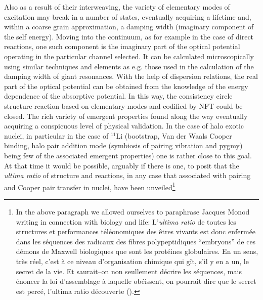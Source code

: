 \begin{subappendices}
Also as a result of their interweaving,  the variety of elementary modes of excitation may break in a number of states, eventually acquiring a lifetime and, within a coarse grain approximation, a damping width (imaginary component of the self energy). Moving into the continuum, as for example in the case of direct reactions, one such component is the imaginary part of the optical potential operating in the particular channel selected. It can be calculated microscopically using similar techniques and elements as e.g. those used in the calculation of the damping width of giant resonances. With the help of dispersion relations, the real part of the optical potential can be obtained from the knowledge of the energy dependence of the absorptive potential. In this way, the consistency circle structure-reaction based on elementary modes and codified by NFT could be closed. The rich variety of emergent properties found along the way eventually acquiring a conspicuous level of physical validation. In the case of halo exotic nuclei, in particular in the case of $^{11}$Li (bootstrap, Van der Waals Cooper binding, halo pair addition mode (symbiosis of pairing vibration and pygmy) being few of the associated emergent properties) one is rather close to this goal. At that time it would be possible, arguably if there is one, to posit that the \textit{ultima ratio} of structure and reactions, in any case that associated with pairing and Cooper pair transfer in nuclei, have been unveiled\footnote{In the above paragraph we allowed ourselves to paraphrase Jacques Monod writing in connection with biology and life: L'\textit{ultima ratio} de toutes les structures et performances t\'el\'eonomiques des \^etres vivants est donc enferm\'ee dans les s\'equences des radicaux des fibres polypeptidiques ``embryons'' de ces d\'emons de Maxwell biologiques que sont les prot\'eines globulaires. En un sens, tr\`{e}s r\'{e}el, c'est \`a ce niveau d'organisation chimique qui g\^it, s'il y en a un, le secret de la vie. Et saurait--on non seullement d\'ecrire les s\'equences, mais \'enoncer la loi d'assemblage \`a laquelle ob\'eissent, on pourrait dire que le secret est perc\'e, l'ultima ratio d\'ecouverte (\cite{Monod:70}).}

\end{subappendices}
